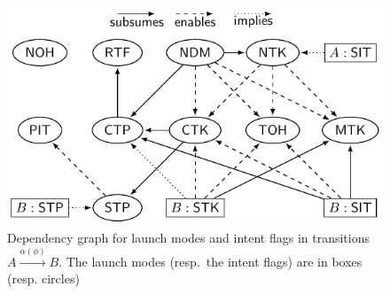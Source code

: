 \begin{figure}
	\centering
	\includegraphics[scale = 0.7]{amass-dependency.pdf}
	\caption{Dependency graph for launch modes and intent flags in transitions $A \xrightarrow{\alpha(\phi)} B$. The launch modes %
		(resp.\ the intent flags) are in boxes (resp. circles)}
	\label{fig-asm-depend}
\end{figure}


